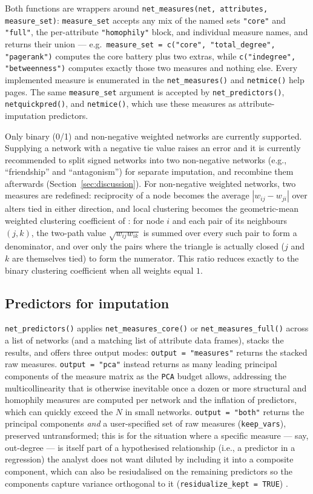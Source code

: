\documentclass[11pt,a4paper]{article}
\newcommand{\code}[1]{\texttt{#1}}
\begin{document}
Both functions are wrappers around  \code{net\_measures(net, attributes, measure\_set)}: \code{measure\_set}
accepts any mix of the named sets \code{"core"} and \code{"full"}, the
per-attribute \code{"homophily"} block, and individual measure names, and
returns their union --- e.g.\ \code{measure\_set = c("core",
"total\_degree", "pagerank")} computes the core battery plus two extras,
while \code{c("indegree", "betweenness")} computes exactly those two
measures and nothing else.
Every implemented measure is enumerated in the \code{net\_measures()} and
\code{netmice()} help pages. The same \code{measure\_set} argument is
accepted by \code{net\_predictors()}, \code{netquickpred()}, and
\code{netmice()}, which use these measures as attribute-imputation
predictors.

Only binary (0/1) and non-negative weighted networks are currently
supported. Supplying a network with a negative tie value raises an
error and it is currently recommended to split signed networks into two non-negative networks (e.g., ``friendship'' and
``antagonism'') for separate imputation, and recombine them afterwards
(Section~\ref{sec:discussion}). For non-negative weighted networks, two
measures are redefined:
reciprocity of a node becomes the average $|w_{ij} - w_{ji}|$ over alters tied in
either direction, and local clustering becomes the geometric-mean
weighted clustering coefficient of \citet{OpsahlPanzarasa2009}: for node
$i$ and each pair of its neighbours $(j,k)$, the two-path value
$\sqrt{w_{ij} w_{ik}}$ is summed over every such pair to form a denominator,
and over only the pairs where the triangle is actually closed ($j$ and $k$
are themselves tied) to form the numerator. This ratio reduces exactly to
the  binary clustering coefficient when all weights equal $1$.

\subsection{Predictors for imputation}
\label{sec:predictors}

\code{net\_predictors()} applies \code{net\_measures\_core()} or
\code{net\_measures\_full()} across a list of networks (and a matching list
of attribute data frames), stacks the results, and
offers three output modes: \code{output = "measures"} returns the stacked
raw measures. \code{output = "pca"} instead returns as many leading principal components of
the measure matrix as the \code{PCA} budget allows, addressing the multicollinearity that is
otherwise inevitable once a dozen or more structural and homophily measures
are computed per network and the inflation of predictors, which can quickly exceed the $N$ in small networks. \code{output = "both"} returns the principal
components \emph{and} a user-specified set of raw measures
(\code{keep\_vars}), preserved untransformed; this is for the situation
where a specific measure --- say, out-degree --- is itself part of a
hypothesised relationship (i.e., a predictor in a regression) the analyst does
not want diluted by including it
into a composite component, which can also be resiudalised on the remaining predictors so the
components capture variance orthogonal to it (\code{residualize\_kept = TRUE}) .
\end{document}

